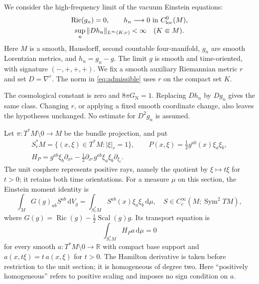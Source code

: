\documentclass[11pt,a4paper]{article}
\numberwithin{equation}{section}
\newcommand{\Ric}{\operatorname{Ric}}
\newcommand{\Scal}{\operatorname{Scal}}
\newcommand{\loc}{\mathrm{loc}}
\newcommand{\dd}{\mathrm d}
\newcommand{\R}{\mathbb R}
\newcommand{\dV}{\dd V_g}
\newcommand{\f}[2]{\frac{#1}{#2}}
\theoremstyle{definition}
\begin{document}
We consider the high-frequency limit of the vacuum Einstein equations:
\begin{equation}\label{eq:admissible}
\begin{gathered}
\Ric(g_n)=0,\qquad
h_n\longrightarrow0\ \hbox{in }C^0_{\loc}(M),\\
\sup_n\|Dh_n\|_{L^\infty(K;r)}<\infty
\quad(K\Subset M).
\end{gathered}
\end{equation}
Here $M$ is a smooth, Hausdorff, second countable four-manifold,
$g_n$ are smooth Lorentzian metrics, and $h_n=g_n-g$.
The limit $g$ is smooth and time-oriented, with signature $(-,+,+,+)$.
We fix a smooth auxiliary Riemannian metric $r$ and set $D=\nabla^r$.
The norm in \eqref{eq:admissible} uses $r$ on the compact set $K$.

The cosmological constant is zero and $8\pi G_{\mathrm N}=1$.
Replacing $Dh_n$ by $Dg_n$ gives the same class. Changing $r$, or applying
a fixed smooth coordinate change, also leaves the hypotheses unchanged.
No estimate for $D^2g_n$ is assumed.

Let $\pi:T^*M\setminus0\to M$ be the bundle projection, and put
\begin{equation}\label{eq:hamiltonian}
\begin{gathered}
S_r^*M=\{(x,\xi)\in T^*M:|\xi|_r=1\},\qquad
P(x,\xi)=\f12g^{ab}(x)\xi_a\xi_b,\\
H_P=g^{ab}\xi_b\partial_{x^a}
-\f12\partial_{x^c}g^{ab}\xi_a\xi_b\partial_{\xi_c}.
\end{gathered}
\end{equation}
The unit cosphere represents positive rays, namely the quotient by
$\xi\mapsto t\xi$ for $t>0$; it retains both time orientations.
For a measure $\mu$ on this section, the Einstein moment identity is
\begin{equation}\label{eq:moment}
\int_M G(g)_{ab}S^{ab}\,\dV
=\int_{S_r^*M}S^{ab}(x)\xi_a\xi_b\,\dd\mu,
\quad S\in C_c^\infty(M;\operatorname{Sym}^2TM),
\end{equation}
where $G(g)=\Ric(g)-\f12\Scal(g)g$. Its transport equation is
\begin{equation}\label{eq:transport}
\int_{S_r^*M}H_Pa\,\dd\mu=0
\end{equation}
for every smooth $a:T^*M\setminus0\to\R$ with compact base support and
$a(x,t\xi)=t\,a(x,\xi)$ for $t>0$. The Hamilton derivative is taken
before restriction to the unit section; it is homogeneous of degree two.
Here ``positively homogeneous'' refers to positive scaling and imposes
no sign condition on $a$.
\end{document}
